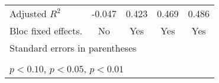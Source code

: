 {\begin{tabular}{l*{4}{c}}
Adjusted \(R^{2}\)  &      -0.047         &       0.423         &       0.469         &       0.486         \\
Bloc fixed effects. &          No         &         Yes         &         Yes         &         Yes         \\
\hline\hline
\multicolumn{5}{l}{\footnotesize Standard errors in parentheses}\\
\multicolumn{5}{l}{\footnotesize }\\
\multicolumn{5}{l}{\footnotesize \sym{*} \(p<0.10\), \sym{**} \(p<0.05\), \sym{***} \(p<0.01\)}\\
\end{tabular}
}
